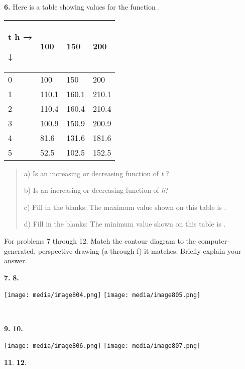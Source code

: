 \textbf{6.} Here is a table showing values for the function .

\begin{longtable}[]{@{}llll@{}}
\toprule
\begin{minipage}[b]{0.24\columnwidth}\raggedright\strut
t h →

↓\strut
\end{minipage} & \begin{minipage}[b]{0.24\columnwidth}\raggedright\strut
100\strut
\end{minipage} & \begin{minipage}[b]{0.24\columnwidth}\raggedright\strut
150\strut
\end{minipage} & \begin{minipage}[b]{0.24\columnwidth}\raggedright\strut
200\strut
\end{minipage}\tabularnewline
\midrule
\endhead
0 & 100 & 150 & 200\tabularnewline
1 & 110.1 & 160.1 & 210.1\tabularnewline
2 & 110.4 & 160.4 & 210.4\tabularnewline
3 & 100.9 & 150.9 & 200.9\tabularnewline
4 & 81.6 & 131.6 & 181.6\tabularnewline
5 & 52.5 & 102.5 & 152.5\tabularnewline
\bottomrule
\end{longtable}

\begin{quote}
a) Is an increasing or decreasing function of \emph{t} ?

b) Is an increasing or decreasing function of \emph{h}?

c) Fill in the blanks: The maximum value shown on this table is .

d) Fill in the blanks: The minimum value shown on this table is .
\end{quote}

For problems 7 through 12. Match the contour diagram to the
computer-generated, perspective drawing (a through f) it matches.
Briefly explain your answer.

\textbf{7.} \textbf{8.}

\texttt{[image: media/image804.png]}
\texttt{[image: media/image805.png]}

\textbf{\\
}

\textbf{9.} \textbf{10.}

\texttt{[image: media/image806.png]}
\texttt{[image: media/image807.png]}

\textbf{11}. \textbf{12}.


